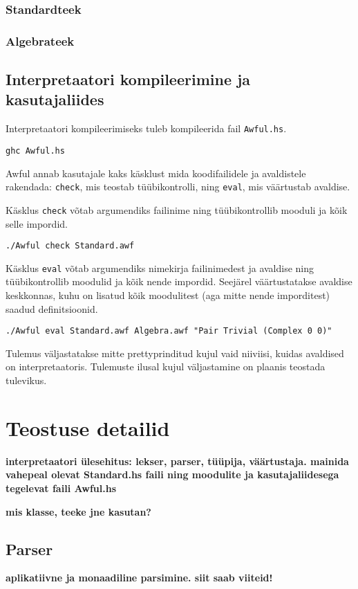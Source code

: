 \documentclass[12pt]{article}
\newcommand\peatykk[1]{
  \clearpage
  \section{#1}}
\newcommand\markus[1]{\textcolor{roheline}{\textbf{#1}}}
\begin{document}
      \subsubsection{Standardteek}
        
      \subsubsection{Algebrateek}
        
    \subsection{Interpretaatori kompileerimine ja kasutajaliides}
      Interpretaatori kompileerimiseks tuleb kompileerida fail \verb!Awful.hs!.

      \begin{verbatim}ghc Awful.hs\end{verbatim}

      Awful annab kasutajale kaks käsklust mida koodifailidele ja avaldistele rakendada: \verb!check!, mis teostab tüübikontrolli, ning \verb!eval!, mis väärtustab avaldise.

      Käsklus \verb!check! võtab argumendiks failinime ning tüübikontrollib mooduli ja kõik selle impordid.

      \begin{verbatim}./Awful check Standard.awf\end{verbatim}

      Käsklus \verb!eval! võtab argumendiks nimekirja failinimedest ja avaldise ning tüübikontrollib moodulid ja kõik nende impordid. Seejärel väärtustatakse avaldise keskkonnas, kuhu on lisatud kõik moodulitest (aga mitte nende imporditest) saadud definitsioonid.

      \begin{verbatim}./Awful eval Standard.awf Algebra.awf "Pair Trivial (Complex 0 0)"\end{verbatim}

      Tulemus väljastatakse mitte prettyprinditud kujul vaid niiviisi, kuidas avaldised on interpretaatoris. Tulemuste ilusal kujul väljastamine on plaanis teostada tulevikus.
  \peatykk{Teostuse detailid}
    \markus{interpretaatori ülesehitus: lekser, parser, tüüpija, väärtustaja. mainida vahepeal olevat Standard.hs faili ning moodulite ja kasutajaliidesega tegelevat faili Awful.hs}

    \markus{mis klasse, teeke jne kasutan?}
    \subsection{Parser}
      \markus{aplikatiivne ja monaadiline parsimine. siit saab viiteid!}
\end{document}
